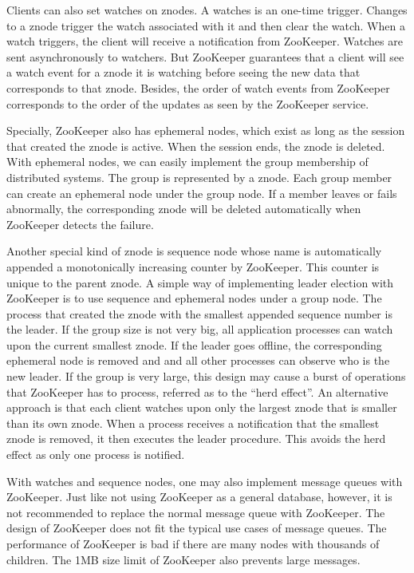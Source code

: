 \documentclass[11pt]{book}
\begin{document}
Clients can also set watches on znodes. A watches is an one-time trigger. Changes to a znode trigger the watch associated with it and then clear the watch. When a watch triggers, the client will receive a notification from ZooKeeper. Watches are sent asynchronously to watchers. But ZooKeeper guarantees that a client will see a watch event for a znode it is watching before seeing the new data that corresponds to that znode. Besides, the order of watch events from ZooKeeper corresponds to the order of the updates as seen by the ZooKeeper service.

Specially, ZooKeeper also has ephemeral nodes, which exist as long as the session that created the znode is active. When the session ends, the znode is deleted. With ephemeral nodes, we can easily implement the group membership of distributed systems. The group is represented by a znode. Each group member can create an ephemeral node under the group node. If a member leaves or fails abnormally, the corresponding znode will be deleted automatically when ZooKeeper detects the failure.

Another special kind of znode is sequence node whose name is automatically appended a monotonically increasing counter by ZooKeeper. This counter is unique to the parent znode. A simple way of implementing leader election with ZooKeeper is to use sequence and ephemeral nodes under a group node. The process that created the znode with the smallest appended sequence number is the leader. If the group size is not very big, all application processes can watch upon the current smallest znode. If the leader goes offline, the corresponding ephemeral node is removed and and all other processes can observe who is the new leader. If the group is very large, this design may cause a burst of operations that ZooKeeper has to process, referred as to the ``herd effect''. An alternative approach is that each client watches upon only the largest znode that is smaller than its own znode. When a process receives a notification that the smallest znode is removed, it then executes the leader procedure. This avoids the herd effect as only one process is notified.

With watches and sequence nodes, one may also implement message queues with ZooKeeper. Just like not using ZooKeeper as a general database, however, it is not recommended to replace the normal message queue with ZooKeeper. The design of ZooKeeper does not fit the typical use cases of message queues. The performance of ZooKeeper is bad if there are many nodes with thousands of children. The 1MB size limit of ZooKeeper also prevents large messages.
\end{document}
